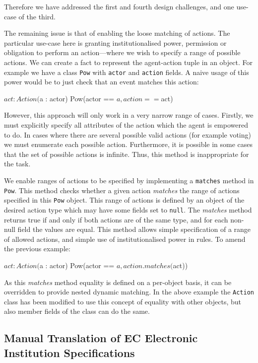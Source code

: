 Therefore we have addressed the first and fourth design challenges, and one use-case
of the third. 

The remaining issue is that of enabling the loose matching of
actions. The particular use-case here is granting institutionalised power,
permission or obligation to perform an action---where we wish to specify a range
of possible actions. We can create a fact to represent the agent-action tuple in
an object. For example we have a class \texttt{Pow} with \texttt{actor} and
\texttt{action} fields. A naive usage of this power would be to just check that
an event matches this action:

\begin{droolsinline}
$act : Action($a : actor)
Pow(actor == $a, action == $act)
\end{droolsinline}

However, this approach will only work in a very narrow range of cases.
Firstly, we must explicitly specify all attributes of the action which the
agent is empowered to do. In cases where there are several possible valid
actions (for example voting) we must enumerate each possible action.
Furthermore, it is possible in some cases that the set of possible actions is
infinite. Thus, this method is inappropriate for the task.

We enable ranges of actions to be specified by implementing a \texttt{matches}
method in \texttt{Pow}. This method checks whether a given action \emph{matches}
the range of actions specified in this \texttt{Pow} object. This range of
actions is defined by an object of the desired action type which may have some
fields set to \texttt{null}. The \emph{matches} method returns true if and only
if both actions are of the same type, and for each non-null field the values are
equal. This method allows simple
specification of a range of allowed actions, and simple use of institutionalised
power in rules. To amend the previous example:

\begin{droolsinline}
$act : Action($a : actor)
Pow(actor == $a, action.matches($act))
\end{droolsinline}

As this \emph{matches} method equality is defined on a per-object basis, it
can be overridden to provide nested dynamic matching. In the above example the
\texttt{Action} class has been modified to use this concept of equality with
other objects, but also member fields of the class can do the same.

\subsection{Manual Translation of EC Electronic Institution Specifications}\label{sec:translate}


